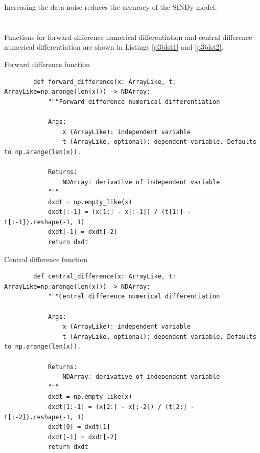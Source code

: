 \documentclass[11pt]{article}
\begin{document}
Increasing the data noise reduces the accuracy of the SINDy model.



\section{}


\subsection{} %

Functions for forward difference numerical differentiation and central difference numerical differentiation are shown in Listings \ref{p3blst1} and \ref{p3blst2}.

\begin{listing}[H]
    \caption{Forward difference function}
    \label{p3blst1}
    \begin{verbatim}
        def forward_difference(x: ArrayLike, t: ArrayLike=np.arange(len(x))) -> NDArray:
            """Forward difference numerical differentiation

            Args:
                x (ArrayLike): independent variable
                t (ArrayLike, optional): dependent variable. Defaults to np.arange(len(x)).

            Returns:
                NDArray: derivative of independent variable
            """
            dxdt = np.empty_like(x)
            dxdt[:-1] = (x[1:] - x[:-1]) / (t[1:] - t[:-1]).reshape(-1, 1)
            dxdt[-1] = dxdt[-2]
            return dxdt
    \end{verbatim}
\end{listing}

\begin{listing}[H]
    \caption{Central difference function}
    \label{p3blst2}
    \begin{verbatim}
        def central_difference(x: ArrayLike, t: ArrayLike=np.arange(len(x))) -> NDArray:
            """Central difference numerical differentiation

            Args:
                x (ArrayLike): independent variable
                t (ArrayLike, optional): dependent variable. Defaults to np.arange(len(x)).

            Returns:
                NDArray: derivative of independent variable
            """
            dxdt = np.empty_like(x)
            dxdt[1:-1] = (x[2:] - x[:-2]) / (t[2:] - t[:-2]).reshape(-1, 1)
            dxdt[0] = dxdt[1]
            dxdt[-1] = dxdt[-2]
            return dxdt
    \end{verbatim}
\end{listing}
\end{document}
